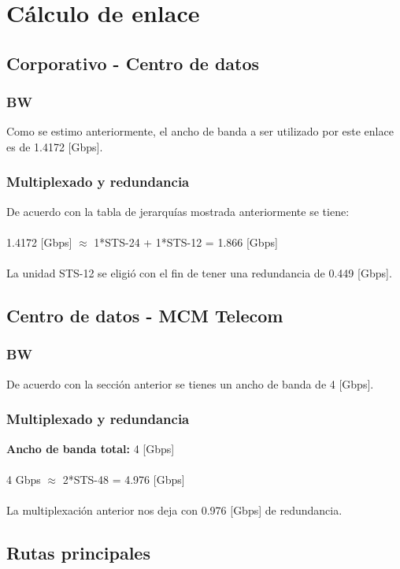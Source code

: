 \documentclass[12pt,letterpaper]{article}
\begin{document}
\newpage
\section{Cálculo de enlace}
\subsection{Corporativo - Centro de datos}
\subsubsection{BW}
Como se estimo anteriormente, el ancho de banda a ser utilizado por este enlace es de 
1.4172 [Gbps].
\subsubsection{Multiplexado y redundancia}
De acuerdo con la tabla de jerarquías mostrada anteriormente se tiene: 
\\ \\
1.4172 [Gbps] $\approx$ 1*STS-24 + 1*STS-12 = 1.866 [Gbps]
\\ \\
La unidad STS-12 se eligió con el fin de tener una redundancia de 0.449 [Gbps].

\subsection{Centro de datos - MCM Telecom}
\subsubsection{BW}
De acuerdo con la sección anterior se tienes un ancho de banda de 4 [Gbps].
\subsubsection{Multiplexado y redundancia}
\textbf{Ancho de banda total: } 4 [Gbps]
\\ \\
4 Gbps $\approx$ 2*STS-48 = 4.976 [Gbps]
\\ \\
La multiplexación anterior nos deja con 0.976 [Gbps] de redundancia.

\newpage
\subsection{Rutas principales}
\end{document}
